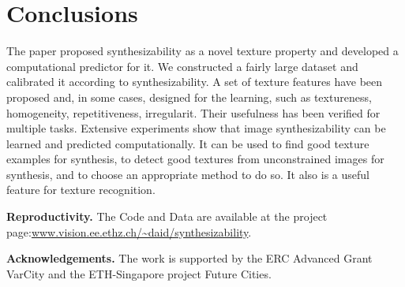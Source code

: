 \documentclass[10pt,twocolumn,letterpaper]{article}
\begin{document}



\section{Conclusions}
\label{sec:conclusion}
The paper proposed synthesizability as a novel texture property and
developed a computational predictor for it. We constructed a fairly
large dataset and calibrated it according to synthesizability. A set
of texture features have been proposed and, in some cases, designed
for the learning, such as textureness, homogeneity, repetitiveness,
irregularit. Their usefulness has been verified for multiple
tasks. Extensive experiments show that image synthesizability can be
learned and predicted computationally. It can be used to find good
texture examples for synthesis, to detect good textures from
unconstrained images for synthesis, and to choose an appropriate
method to do so. It also is a useful feature for texture recognition.


\vspace{1.5mm}
\noindent
\textbf{Reproductivity.} The Code and Data are available at the project page:\url{www.vision.ee.ethz.ch/~daid/synthesizability}.

\vspace{1.5mm}
\noindent
\textbf{Acknowledgements.} The work is supported by the ERC Advanced Grant VarCity and 
the ETH-Singapore project Future Cities.


{\footnotesize


}
\end{document}
